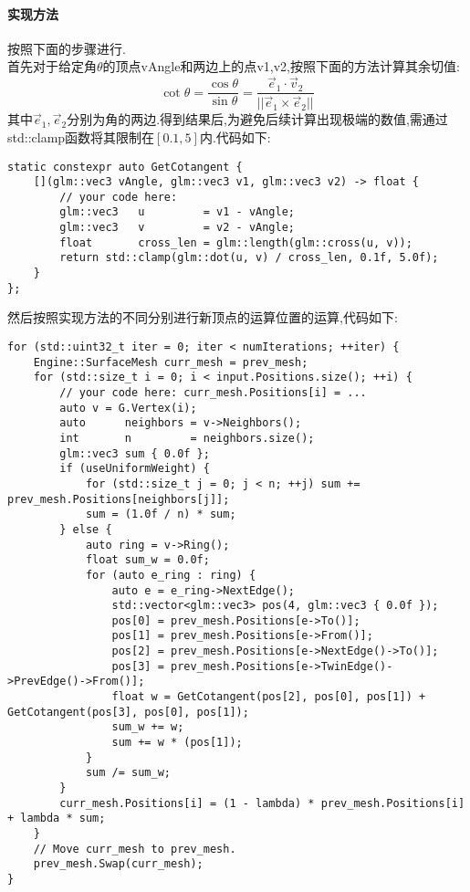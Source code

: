 \documentclass{ctexart}
\begin{document}
\paragraph{实现方法}
按照下面的步骤进行.\\
\indent 首先对于给定角$\theta$的顶点{\codefont vAngle}和两边上的点{\codefont v1,v2},按照下面的方法计算其余切值:
\[\cot\theta=\dfrac{\cos\theta}{\sin\theta}=\dfrac{\vec{e}_1\cdot\vec{v}_2}{||\vec{e}_1\times\vec{e}_2||}\]
其中$\vec{e}_1,\vec{e}_2$分别为角的两边.得到结果后,为避免后续计算出现极端的数值,需通过{\codefont std::clamp}函数将其限制在$[0.1,5]$内.代码如下:
\begin{lstlisting}
static constexpr auto GetCotangent {
    [](glm::vec3 vAngle, glm::vec3 v1, glm::vec3 v2) -> float {
        // your code here:
        glm::vec3   u         = v1 - vAngle;
        glm::vec3   v         = v2 - vAngle;
        float       cross_len = glm::length(glm::cross(u, v));
        return std::clamp(glm::dot(u, v) / cross_len, 0.1f, 5.0f);
    }
};
\end{lstlisting}
然后按照实现方法的不同分别进行新顶点的运算位置的运算,代码如下:
\begin{lstlisting}
for (std::uint32_t iter = 0; iter < numIterations; ++iter) {
    Engine::SurfaceMesh curr_mesh = prev_mesh;
    for (std::size_t i = 0; i < input.Positions.size(); ++i) {
        // your code here: curr_mesh.Positions[i] = ...
        auto v = G.Vertex(i);
        auto      neighbors = v->Neighbors();
        int       n         = neighbors.size();
        glm::vec3 sum { 0.0f };
        if (useUniformWeight) {
            for (std::size_t j = 0; j < n; ++j) sum += prev_mesh.Positions[neighbors[j]];
            sum = (1.0f / n) * sum;
        } else {
            auto ring = v->Ring();
            float sum_w = 0.0f;
            for (auto e_ring : ring) {
                auto e = e_ring->NextEdge();
                std::vector<glm::vec3> pos(4, glm::vec3 { 0.0f });
                pos[0] = prev_mesh.Positions[e->To()];
                pos[1] = prev_mesh.Positions[e->From()];
                pos[2] = prev_mesh.Positions[e->NextEdge()->To()];
                pos[3] = prev_mesh.Positions[e->TwinEdge()->PrevEdge()->From()];
                float w = GetCotangent(pos[2], pos[0], pos[1]) + GetCotangent(pos[3], pos[0], pos[1]);
                sum_w += w;
                sum += w * (pos[1]);
            }
            sum /= sum_w;
        }
        curr_mesh.Positions[i] = (1 - lambda) * prev_mesh.Positions[i] + lambda * sum;
    }
    // Move curr_mesh to prev_mesh.
    prev_mesh.Swap(curr_mesh);
}
\end{lstlisting}
\end{document}
